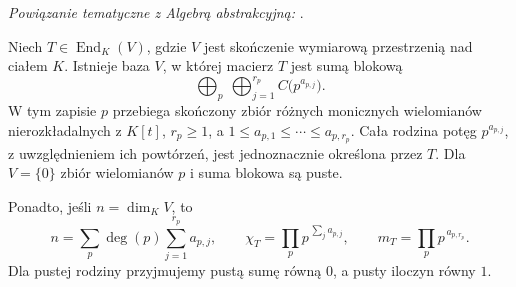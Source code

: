 \noindent\emph{Powiązanie tematyczne z Algebrą abstrakcyjną:} .


\begin{twierdzenie}
\label{thm:lin20-elementary}
Niech \(T\in\operatorname{End}_K(V)\),
gdzie \(V\) jest skończenie wymiarową
przestrzenią nad ciałem \(K\).
Istnieje baza \(V\), w której macierz
\(T\) jest sumą blokową
\[
 \bigoplus_{p}\ \bigoplus_{j=1}^{r_p}
 C\bigl(p^{a_{p,j}}\bigr).
\]
W tym zapisie \(p\) przebiega skończony
zbiór różnych monicznych wielomianów
nierozkładalnych z \(K[t]\),
\(r_p\ge1\), a
\(1\le a_{p,1}\le\cdots\le a_{p,r_p}\).
Cała rodzina potęg \(p^{a_{p,j}}\),
z uwzględnieniem ich powtórzeń,
jest jednoznacznie określona przez \(T\).
Dla \(V=\{0\}\) zbiór wielomianów \(p\)
i suma blokowa są puste.

Ponadto, jeśli \(n=\dim_K V\),
to
\[
 n=\sum_p\deg(p)\sum_{j=1}^{r_p}a_{p,j},
 \qquad
 \chi_T=\prod_p p^{\,\sum_j a_{p,j}},
 \qquad
 m_T=\prod_p p^{\,a_{p,r_p}}.
\]
Dla pustej rodziny przyjmujemy
pustą sumę równą \(0\), a pusty
iloczyn równy \(1\).
\end{twierdzenie}
